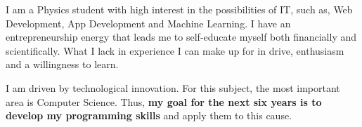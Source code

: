 \documentclass[9pt]{developercv} %
\begin{document}
\vspace{0.5cm}



\begin{minipage}[t]{0.4\textwidth} %
	\vspace{-\baselineskip} %
	
	I am a Physics student with high interest in the possibilities of IT, such as, Web Development, App Development and Machine Learning. I have an entrepreneurship energy that leads me to self-educate myself both financially and scientifically. What I lack in experience I can make up for in drive, enthusiasm and a willingness to learn.%
\end{minipage}
\hfill %
\begin{minipage}[t]{0.5\textwidth} %
	\vspace{-\baselineskip} %
	\begin{barchart}{5.5}
	\end{barchart}
\end{minipage}



I am driven by technological innovation. For this subject, the most important area is Computer Science. Thus, \textbf{my goal for the next six years is to develop my programming skills} and apply them to this cause.


\end{document}
